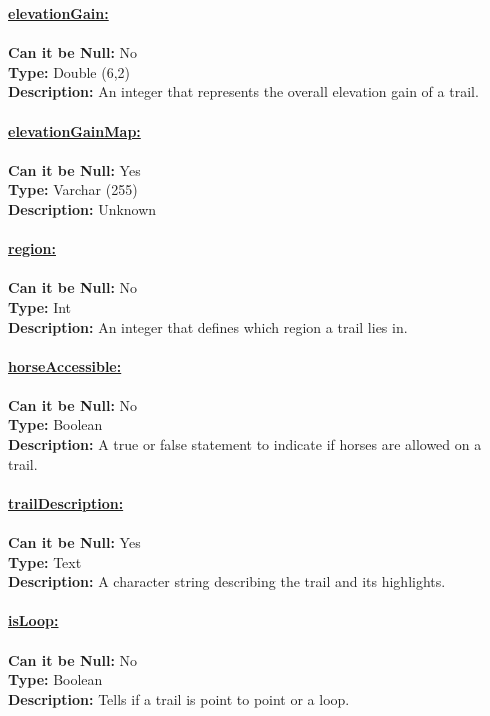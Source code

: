 \textbf{\underline{elevationGain:}} \\\\
\textbf{Can it be Null:} No\\
\textbf{Type:} Double (6,2)\\
\textbf{Description:} An integer that represents the overall elevation gain of a trail. \\\\


\textbf{\underline{elevationGainMap:}}\\\\
\textbf{Can it be Null:} Yes\\
\textbf{Type:} Varchar (255)\\
\textbf{Description:} Unknown\\\\


\textbf{\underline{region:}}\\\\
\textbf{Can it be Null:} No\\
\textbf{Type:} Int \\
\textbf{Description:} An integer that defines which region a trail lies in. \\\\


\textbf{\underline{horseAccessible:}}\\\\
\textbf{Can it be Null:} No\\
\textbf{Type:} Boolean\\
\textbf{Description:} A true or false statement to indicate if horses are allowed 
on a trail. \\\\


\textbf{\underline{trailDescription:}}\\\\
\textbf{Can it be Null:} Yes\\
\textbf{Type:} Text\\
\textbf{Description:} A character string describing
the trail and its highlights. \\\\


\textbf{\underline{isLoop:}}\\\\
\textbf{Can it be Null:} No\\
\textbf{Type:} Boolean\\
\textbf{Description:} Tells if a trail is point to point or a loop.\\\\



